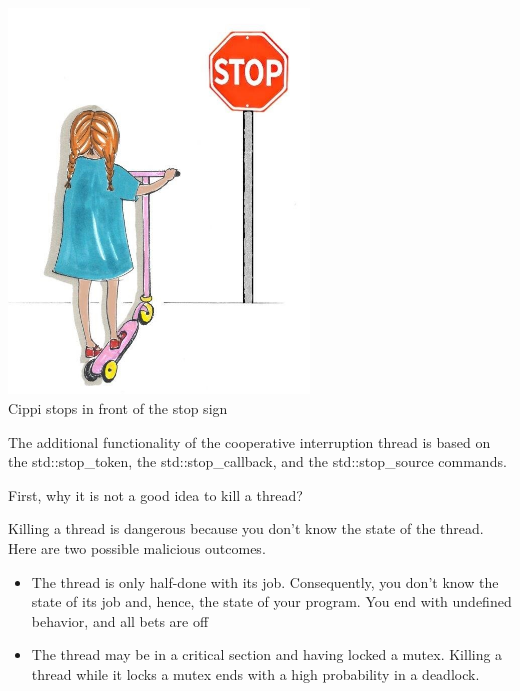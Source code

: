 \begin{center}
\includegraphics[width=0.6\textwidth]{content/3/chapter6/images/22.png}\\
Cippi stops in front of the stop sign
\end{center}

The additional functionality of the cooperative interruption thread is based on the std::stop\_token, the std::stop\_callback, and the std::stop\_source commands.

First, why it is not a good idea to kill a thread?

\begin{tcolorbox}[colback=red!5!white,colframe=red!75!black,title={Killing a Thread is Dangerous}]
	
Killing a thread is dangerous because you don’t know the state of the thread. Here are two possible malicious outcomes.

\begin{itemize}
\item 
The thread is only half-done with its job. Consequently, you don’t know the state of its job and, hence, the state of your program. You end with undefined behavior, and all bets are off

\item 
The thread may be in a critical section and having locked a mutex. Killing a thread while it locks a mutex ends with a high probability in a deadlock.
\end{itemize}
\end{tcolorbox}


